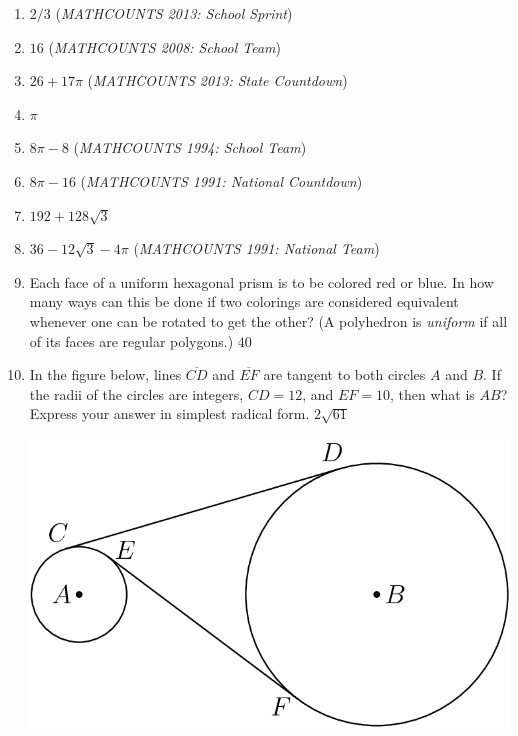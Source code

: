 \documentclass{article}
\begin{document}
\newpage

\begin{enumerate}
\item $2/3$ (\emph{MATHCOUNTS 2013: School Sprint})\vspace{1cm}
\item $16$ (\emph{MATHCOUNTS 2008: School Team})\vspace{1cm}
\item $26 + 17\pi$ (\emph{MATHCOUNTS 2013: State Countdown})\vspace{1cm}
\item $\pi$\vspace{1cm}
\item $8\pi - 8$ (\emph{MATHCOUNTS 1994: School Team})\vspace{1cm}
\item $8\pi - 16$ (\emph{MATHCOUNTS 1991: National Countdown})\vspace{1cm}
\item $192 + 128\sqrt{3}$\vspace{1cm}
\item $36 - 12\sqrt{3} - 4\pi$ (\emph{MATHCOUNTS 1991: National Team})\vspace{1cm}
\item Each face of a uniform hexagonal prism is to be colored red or blue. In how many ways can this be done if two colorings are considered equivalent whenever one can be rotated to get the other? (A polyhedron is \emph{uniform} if all of its faces are regular polygons.) $\boxed{40}$
\vspace{1cm}
\item In the figure below, lines $\overline{CD}$ and $\overline{EF}$ are tangent to both circles $A$ and $B$. If the radii of the circles are integers, $CD = 12$, and $EF = 10$, then what is $AB$? Express your answer in simplest radical form. $\boxed{2\sqrt{61}}$
\begin{center}
\includegraphics[scale=0.18]{circles.png}
\end{center}
\end{enumerate}
\end{document}
